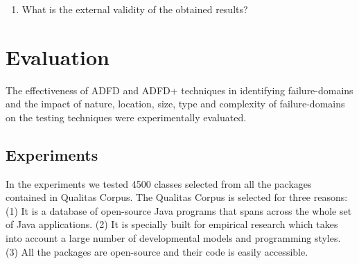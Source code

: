 \documentclass[runningheads,a4paper]{llncs}
\begin{document}
\begin{enumerate}
%
%

\item What is the external validity of the obtained results?

\end{enumerate}




\section{Evaluation}
The effectiveness of ADFD and ADFD+ techniques in identifying failure-domains and the impact of nature, location, size, type and complexity of failure-domains on the testing techniques were experimentally evaluated. 


\subsection{Experiments}
In the experiments we tested 4500 classes selected from all the packages contained in Qualitas Corpus. The Qualitas Corpus is selected for three reasons: (1) It is a database of open-source Java programs that spans across the whole set of Java applications. (2) It is specially built for empirical research which takes into account a large number of developmental models and programming styles. (3) All the packages are open-source and their code is easily accessible. 
\end{document}
